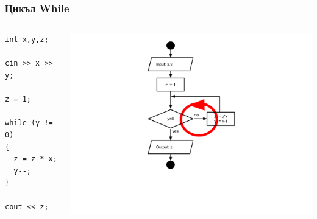 \documentclass{beamer}
\begin{document}
\begin{frame}[fragile]
\frametitle{Цикъл While}


\begin{columns}[t]
  \begin{column}{0.3\textwidth}
\begin{lstlisting}
int x,y,z;

cin >> x >> y;

z = 1;

while (y != 0)
{
  z = z * x;
  y--;
}

cout << z;

\end{lstlisting}

  \end{column}
  \begin{column}{0.7\textwidth}

\hspace*{-90pt}
\includegraphics[width=12cm]{images/fc_cycle_arrows} 


  \end{column}
\end{columns}


\end{frame}
\end{document}
